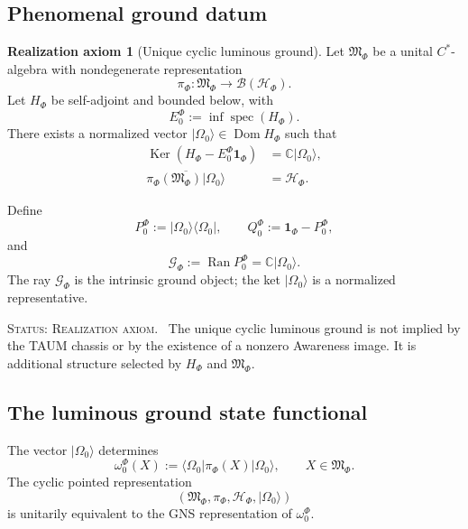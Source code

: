 \documentclass[11pt,reqno]{scrartcl}
\newcommand{\CC}{\mathbb C}
\newcommand{\scrHF}{\mathscr H_{\Phi}}
\newcommand{\algF}{\mathfrak M_{\Phi}}
\newcommand{\piF}{\pi_{\Phi}}
\newcommand{\omegaF}{\omega_{0}^{\Phi}}
\newcommand{\PzeroF}{P_{0}^{\Phi}}
\newcommand{\QzeroF}{Q_{0}^{\Phi}}
\newcommand{\idop}{\mathbf 1}
\newcommand{\ket}[1]{\lvert #1\rangle}
\newcommand{\bra}[1]{\langle #1\rvert}
\DeclareMathOperator{\Dom}{Dom}
\DeclareMathOperator{\Ran}{Ran}
\DeclareMathOperator{\Ker}{Ker}
\DeclareMathOperator{\spec}{spec}
\newcommand{\statuslabel}[1]{\par\smallskip\noindent\textsc{Status: #1.}\ }
\theoremstyle{plain}
\theoremstyle{definition}
\newtheorem{axiom}[axiom]{Realization axiom}
\theoremstyle{remark}
\begin{document}
\subsection{Phenomenal ground datum}

\begin{axiom}[Unique cyclic luminous ground]
\label{ax:phenomenal-ground}
Let $\algF$ be a unital $C^*$-algebra with nondegenerate representation
\begin{equation}
  \piF:\algF\longrightarrow\mathcal B(\scrHF).
\end{equation}
Let $H_{\Phi}$ be self-adjoint and bounded below, with
\begin{equation}
  E_0^{\Phi}:=\inf\spec(H_{\Phi}).
\end{equation}
There exists a normalized vector $\ket{\Omega_0}\in\Dom H_{\Phi}$ such that
\begin{align}
  \Ker(H_{\Phi}-E_0^{\Phi}\idop_{\Phi})
  &=\CC\ket{\Omega_0},
  \label{eq:phenomenal-unique-ground}\\
  \overline{\piF(\algF)\ket{\Omega_0}}
  &=\scrHF.
  \label{eq:phenomenal-cyclic-ground}
\end{align}
\end{axiom}

Define
\begin{equation}
  \PzeroF:=\ket{\Omega_0}\!\bra{\Omega_0},
  \qquad
  \QzeroF:=\idop_{\Phi}-\PzeroF,
  \label{eq:phenomenal-ground-projections}
\end{equation}
and
\begin{equation}
  \mathscr G_{\Phi}:=\Ran\PzeroF=\CC\ket{\Omega_0}.
  \label{eq:phenomenal-ground-ray}
\end{equation}
The ray $\mathscr G_{\Phi}$ is the intrinsic ground object; the ket
$\ket{\Omega_0}$ is a normalized representative.

\statuslabel{Realization axiom} The unique cyclic luminous ground is not
implied by the TAUM chassis or by the existence of a nonzero Awareness image.
It is additional structure selected by $H_{\Phi}$ and $\algF$.

\subsection{The luminous ground state functional}

The vector $\ket{\Omega_0}$ determines
\begin{equation}
  \boxed{
  \omegaF(X)
  :=\bra{\Omega_0}\piF(X)\ket{\Omega_0},
  \qquad X\in\algF.}
  \label{eq:phenomenal-ground-functional}
\end{equation}
The cyclic pointed representation
\begin{equation}
  (\algF,\piF,\scrHF,\ket{\Omega_0})
  \label{eq:phenomenal-pointed-representation}
\end{equation}
is unitarily equivalent to the GNS representation of $\omegaF$.
\end{document}
